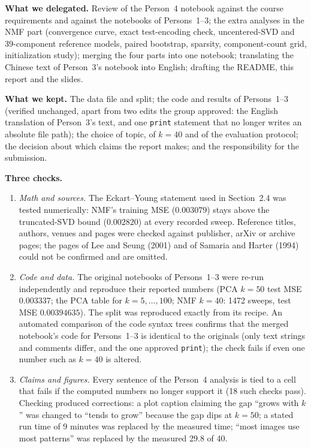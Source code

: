 \documentclass[10pt]{article}
\begin{document}
\textbf{What we delegated.} Review of the Person~4 notebook against the course requirements and against the notebooks of Persons~1--3; the extra analyses in the NMF part (convergence curve, exact test-encoding check, uncentered-SVD and 39-component reference models, paired bootstrap, sparsity, component-count grid, initialization study); merging the four parts into one notebook; translating the Chinese text of Person~3's notebook into English; drafting the README, this report and the slides.

\textbf{What we kept.} The data file and split; the code and results of Persons~1--3 (verified unchanged, apart from two edits the group approved: the English translation of Person~3's text, and one \texttt{print} statement that no longer writes an absolute file path); the choice of topic, of $k=40$ and of the evaluation protocol; the decision about which claims the report makes; and the responsibility for the submission.

\textbf{Three checks.}
\begin{enumerate}[label=\arabic*.]
\item \emph{Math and sources.} The Eckart--Young statement used in Section~2.4 was tested numerically: NMF's training MSE ($0.003079$) stays above the truncated-SVD bound ($0.002820$) at every recorded sweep. Reference titles, authors, venues and pages were checked against publisher, arXiv or archive pages; the pages of Lee and Seung (2001) and of Samaria and Harter (1994) could not be confirmed and are omitted.
\item \emph{Code and data.} The original notebooks of Persons~1--3 were re-run independently and reproduce their reported numbers (PCA $k=50$ test MSE $0.003337$; the PCA table for $k=5,\dots,100$; NMF $k=40$: 1472 sweeps, test MSE $0.00394635$). The split was reproduced exactly from its recipe. An automated comparison of the code syntax trees confirms that the merged notebook's code for Persons~1--3 is identical to the originals (only text strings and comments differ, and the one approved \texttt{print}); the check fails if even one number such as $k=40$ is altered.
\item \emph{Claims and figures.} Every sentence of the Person~4 analysis is tied to a cell that fails if the computed numbers no longer support it (18 such checks pass). Checking produced corrections: a plot caption claiming the gap ``grows with $k$'' was changed to ``tends to grow'' because the gap dips at $k=50$; a stated run time of 9 minutes was replaced by the measured time; ``most images use most patterns'' was replaced by the measured 29.8 of 40.
\end{enumerate}
\end{document}
